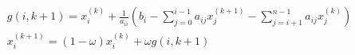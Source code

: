 \documentclass{article}
\begin{document}
\begin{multline}\\
	g(i, k + 1) = x_i^{(k)} + \frac{1}{a_{ii}}(b_i - \sum_{j=0}^{i - 1} {a_{ij}x_{j}^{(k+1)}} - \sum_{j=i+1}^{n - 1} {a_{ij}x_{j}^{(k)}}) \\
	x_i^{(k+1)} = (1 - \omega)x_i^{(k)} + \omega g(i, k + 1)                                                                                                                                                                                                                                                                                                                                                                                                                                                                                                                                                                                                                                                                                                                                                                                                                                                                                                                                                                                                                                                                                                                                                                                                                                                                                                                                                                                                                                                                                                                                                                                                                                                                                                                                                                                                                                                                                                                                                                                                                                                                                                                                                                                                                                                                                                                                                                                                                                                                                                                                                                                                                                                                                                                                                                                                                                                                                                                                                                                                                                                                                                                  
\end{multline}
\end{document}
